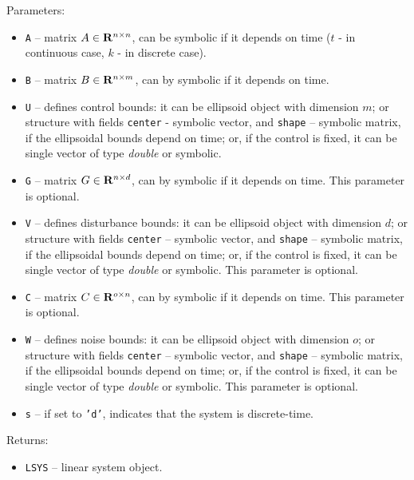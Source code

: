 Parameters:
\begin{itemize}
\item {\tt A} -- matrix $A\in{\bf R}^{n\times n}$, can be symbolic if it
depends on time ($t$ - in continuous case, $k$ - in discrete case).
\item {\tt B} -- matrix $B\in{\bf R}^{n\times m}$, can by symbolic if it
depends on time.
\item {\tt U} -- defines control bounds: it can be ellipsoid object with
dimension $m$; or structure with fields {\tt center} - symbolic vector,
and {\tt shape} -- symbolic matrix, if the ellipsoidal bounds depend on time;
or, if the control is fixed, it can be single vector of type {\it double}
or symbolic.
\item {\tt G} -- matrix $G\in{\bf R}^{n\times d}$, can by symbolic if it
depends on time. This parameter is optional.
\item {\tt V} -- defines disturbance bounds: it can be ellipsoid object with
dimension $d$; or structure with fields {\tt center} -- symbolic vector,
and {\tt shape} -- symbolic matrix, if the ellipsoidal bounds depend on time;
or, if the control is fixed, it can be single vector of type {\it double}
or symbolic. This parameter is optional.
\item {\tt C} -- matrix $C\in{\bf R}^{o\times n}$, can by symbolic if it
depends on time. This parameter is optional.
\item {\tt W} -- defines noise bounds: it can be ellipsoid object with
dimension $o$; or structure with fields {\tt center} -- symbolic vector,
and {\tt shape} -- symbolic matrix, if the ellipsoidal bounds depend on time;
or, if the control is fixed, it can be single vector of type {\it double}
or symbolic. This parameter is optional.
\item {\tt s} -- if set to {\tt 'd'}, indicates that the system is discrete-time.
\end{itemize}

Returns:
\begin{itemize}
\item {\tt LSYS} -- linear system object.
\end{itemize}



